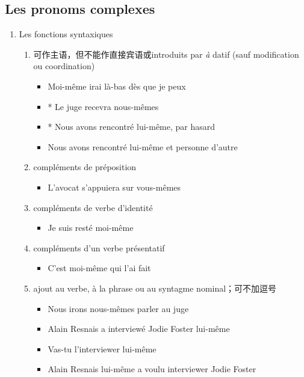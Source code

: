 \documentclass[UTF8]{report}
\begin{document}
\subsection{Les pronoms complexes}
\begin{enumerate}
    \item Les fonctions syntaxiques
    \begin{enumerate}
        \item 可作主语，但不能作直接宾语或introduits par \emph{à} datif (sauf modification ou coordination)
        \begin{itemize}
            \item Moi-même irai là-bas dès que je peux
            \item * Le juge recevra nous-mêmes
            \item * Nous avons rencontré lui-même, par hasard
            \item  Nous avons rencontré lui-même et personne d’autre
        \end{itemize}
        \item compléments de préposition
        \begin{itemize}
            \item L’avocat s’appuiera sur vous-mêmes
        \end{itemize}
        \item compléments de verbe d’identité
        \begin{itemize}
            \item Je suis resté moi-même
        \end{itemize}
        \item compléments d’un verbe présentatif
        \begin{itemize}
            \item C’est moi-même qui l’ai fait
        \end{itemize}
        \item ajout au verbe, à la phrase ou au syntagme nominal；可不加逗号
        \begin{itemize}
            \item Nous irons nous-mêmes parler au juge
            \item Alain Resnais a interviewé Jodie Foster lui-même
            \item Vas-tu l’interviewer lui-même
            \item Alain Resnais lui-même a voulu interviewer Jodie Foster
        \end{itemize}

\end{enumerate}
\end{enumerate}
\end{document}
